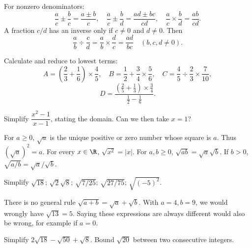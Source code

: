 \begin{keypoint}
For nonzero denominators:
\[\frac ac\pm\frac bc=\frac{a\pm b}{c},\quad\frac ac\pm\frac bd=\frac{ad\pm bc}{cd},\quad\frac ac\times\frac bd=\frac{ab}{cd}.\]
A fraction $c/d$ has an inverse only if $c\ne0$ and $d\ne0$. Then
\[\frac ab\div\frac cd=\frac ab\times\frac dc=\frac{ad}{bc}\quad(b,c,d\ne0).\]
\end{keypoint}
\begin{example}Calculate and reduce to lowest terms:
\[A=\left(\frac23+\frac16\right)\times\frac45,\quad B=\frac12+\frac34\times\frac56,\quad C=\frac45\div\frac23\times\frac7{10},\]
\[D=\frac{\left(\frac25+\frac13\right)\times\frac34}{\frac12-\frac16}.\]\end{example}
\begin{example}Simplify $\dfrac{x^2-1}{x-1}$, stating the domain. Can we then take $x=1$?\end{example}

\begin{keypoint}
For $a\geq0$, $\sqrt a$ is the unique positive or zero number whose square is $a$. Thus $(\sqrt a)^2=a$. For every $x\in\R$, $\sqrt{x^2}=|x|$.
For $a,b\geq0$, $\sqrt{ab}=\sqrt a\sqrt b$. If $b>0$, $\sqrt{a/b}=\sqrt a/\sqrt b$.
\end{keypoint}
\begin{example}Simplify $\sqrt{18}$; $\sqrt2\sqrt8$; $\sqrt{7/25}$; $\sqrt{27/75}$; $\sqrt{(-5)^2}$.\end{example}
\begin{pitfall}There is no general rule $\sqrt{a+b}=\sqrt a+\sqrt b$. With $a=4,b=9$, we would wrongly have $\sqrt{13}=5$. Saying these expressions are always different would also be wrong, for example if $a=0$.\end{pitfall}
\begin{example}Simplify $2\sqrt{18}-\sqrt{50}+\sqrt8$. Bound $\sqrt{20}$ between two consecutive integers.\end{example}

